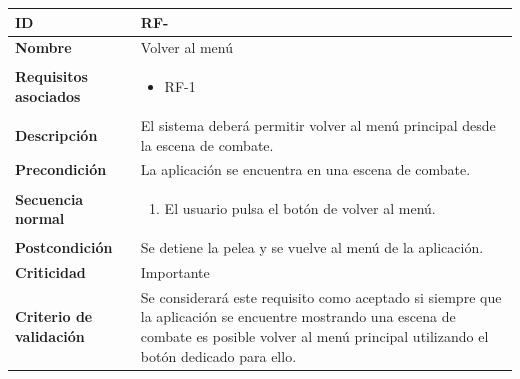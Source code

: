 \begin{center}
	\begin{tabular}{ | p{4.7cm} | p{10cm} | } 
		\hline
		
		\textbf{ID} & RF-\arabic{contador_requisitos_funcionales}
		{contador_requisitos_funcionales} \\
		
		\hline 
		\textbf{Nombre} &
		Volver al menú\\ 
		
		\hline
		\textbf{Requisitos asociados} & 
		\begin{itemize}
			\item RF-1
		\end{itemize}\\
		
		\hline
		\textbf{Descripción} & 
		El sistema deberá permitir volver al menú principal desde la escena de combate.\\
		
		\hline
		\textbf{Precondición} & 
		La aplicación se encuentra en una escena de combate.\\
		
		\hline
		\textbf{Secuencia normal} &
		\begin{enumerate}
			\item El usuario pulsa el botón de volver al menú.
		\end{enumerate}
		\\
		
		\hline
		\textbf{Postcondición} & 
		Se detiene la pelea y se vuelve al menú de la aplicación.\\
		
		\hline 
		\textbf{Criticidad} &
		Importante\\
		
		\hline 
		\textbf{Criterio de validación} & 
		Se considerará este requisito como aceptado si siempre que la aplicación se encuentre mostrando una escena de combate es posible volver al menú principal utilizando el botón dedicado para ello.\\
		
		\hline
	\end{tabular}
\end{center}


